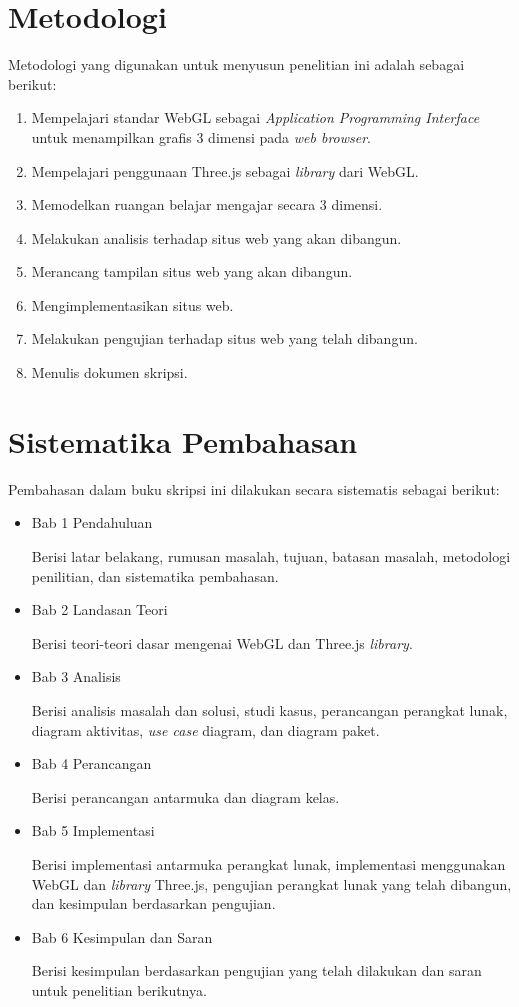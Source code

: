 \section{Metodologi}
\label{sec:metlit}
Metodologi yang digunakan untuk menyusun penelitian ini adalah sebagai berikut:
\begin{enumerate}
    \item Mempelajari standar WebGL sebagai \textit{Application Programming Interface} untuk menampilkan grafis 3 dimensi pada \textit{web browser}.
    \item Mempelajari penggunaan Three.js sebagai \textit{library} dari WebGL.
    \item Memodelkan ruangan belajar mengajar secara 3 dimensi.
    \item Melakukan analisis terhadap situs web yang akan dibangun.
    \item Merancang tampilan situs web yang akan dibangun.
    \item Mengimplementasikan situs web.
    \item Melakukan pengujian terhadap situs web yang telah dibangun.
    \item Menulis dokumen skripsi.
\end{enumerate}

\section{Sistematika Pembahasan}
\label{sec:sispem}
Pembahasan dalam buku skripsi ini dilakukan secara sistematis sebagai berikut:
\begin{itemize}
    \item Bab 1 Pendahuluan
    
    Berisi latar belakang, rumusan masalah, tujuan, batasan masalah, metodologi penilitian, dan sistematika pembahasan.
    
    \item Bab 2 Landasan Teori
    
    Berisi teori-teori dasar mengenai WebGL dan Three.js \textit{library}.
    
    \item Bab 3 Analisis
    
    Berisi analisis masalah dan solusi, studi kasus, perancangan perangkat lunak, diagram aktivitas, \textit{use case} diagram, dan diagram paket.
    
    \item Bab 4 Perancangan
    
    Berisi perancangan antarmuka dan diagram kelas.
    
    \item Bab 5 Implementasi
    
    Berisi implementasi antarmuka perangkat lunak, implementasi menggunakan WebGL dan \textit{library} Three.js, pengujian perangkat lunak yang telah dibangun, dan kesimpulan berdasarkan pengujian.
    
    \item Bab 6 Kesimpulan dan Saran
    
    Berisi kesimpulan berdasarkan pengujian yang telah dilakukan dan saran untuk penelitian berikutnya.
\end{itemize}